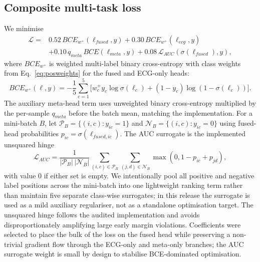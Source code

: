 \documentclass[mathematics,article,submit,pdftex]{Definitions/mdpi}
\def\mathrm#1{#1}%
\def\mathbf#1{#1}%
\def\bm#1{#1}%
\begin{document}
\subsection{Composite multi-task loss}
We minimise
\begin{equation}
\begin{aligned}
\mathcal{L}={}&0.52\,\mathrm{BCE}_{\mathbf{w}^{+}}\!(\bm{\ell}_{\mathrm{fused}},\mathbf{y})
 +0.30\,\mathrm{BCE}_{\mathbf{w}^{+}}\!(\bm{\ell}_{\mathrm{ecg}},\mathbf{y})\\
&+0.10\,q_{\mathrm{meta}}\,\mathrm{BCE}\!(\bm{\ell}_{\mathrm{meta}},\mathbf{y})
 +0.08\,\mathcal{L}_{\mathrm{AUC}}\!(\sigma(\bm{\ell}_{\mathrm{fused}}),\mathbf{y}),
\end{aligned}
\end{equation}
where $\mathrm{BCE}_{\mathbf{w}^{+}}$ is weighted multi-label binary cross-entropy with class weights from Eq.~\eqref{eq:posweights} for the fused and ECG-only heads:
\[
\mathrm{BCE}_{\mathbf{w}^{+}}(\bm{\ell},\mathbf{y})
=-\frac{1}{5}\sum_{c=1}^{5}\bigl[w_c^{+}y_c\log\sigma(\ell_c)+(1-y_c)\log(1-\sigma(\ell_c))\bigr].
\]
The auxiliary meta-head term uses unweighted binary cross-entropy multiplied by the per-sample $q_{\mathrm{meta}}$ before the batch mean, matching the implementation. For a mini-batch $B$, let $\mathcal{P}_B=\{(i,c):y_{ic}=1\}$ and $\mathcal{N}_B=\{(i,c):y_{ic}=0\}$ using fused-head probabilities $p_{ic}=\sigma(\ell_{\mathrm{fused},ic})$. The AUC surrogate is the implemented unsquared hinge
\[
\mathcal{L}_{\mathrm{AUC}}=
\frac{1}{|\mathcal{P}_B|\,|\mathcal{N}_B|}
\sum_{(i,c)\in\mathcal{P}_B}\sum_{(j,d)\in\mathcal{N}_B}
\max(0,1-p_{ic}+p_{jd}),
\]
with value 0 if either set is empty. We intentionally pool all positive and negative label positions across the mini-batch into one lightweight ranking term rather than maintain five separate class-wise surrogates; in this release the surrogate is used as a mild auxiliary regulariser, not as a standalone optimisation target. The unsquared hinge follows the audited implementation and avoids disproportionately amplifying large early margin violations. Coefficients were selected to place the bulk of the loss on the fused head while preserving a non-trivial gradient flow through the ECG-only and meta-only branches; the AUC surrogate weight is small by design to stabilise BCE-dominated optimisation.
\end{document}
